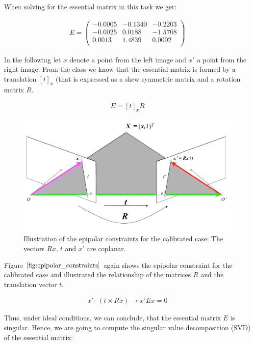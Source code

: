 \documentclass{paper}
\begin{document}
When solving for the essential matrix in this task we get:

\begin{align}
E = 
\left(\begin{array}{rrr}
   -0.0005  & -0.1340 &  -0.2203 \\
   -0.0025  &  0.0188 &  -1.5708 \\
    0.0013  &  1.4839 &   0.0002 \\
\end{array} \right)
\end{align}

In the following let $x$ denote a point from the left image and $x'$ a point from the right image. From the class we know that the essential matrix is formed by a translation $[t]_x$ (that is expressed as a skew symmetric matrix and a rotation matrix $R$. 

\begin{align}
    E = [t]_x R 
\end{align}

\begin{figure}[h]
    \centering
    \includegraphics[width=\textwidth]{figures/epipol_const_cal_case}
    \caption{Illustration of the epipolar constraints for the calibrated case: The vectors $Rx$, $t$ and $x'$ are coplanar.}
    \label{fig:epipolar_constraints}
\end{figure}

Figure $\ref{fig:epipolar_constraints}$ again shows the epipolar constraint for the calibrated case and illustrated the relationship of the matrices $R$ and the translation vector $t$. 

\begin{align}
    x' \cdot \left( t \times R x \right) \rightarrow x' E x = 0
\end{align}

Thus, under ideal conditions, we can conclude, that the essential matrix $E$ is singular. Hence, we are going to compute the singular value decomposition (SVD) of the essential matrix:
\end{document}
